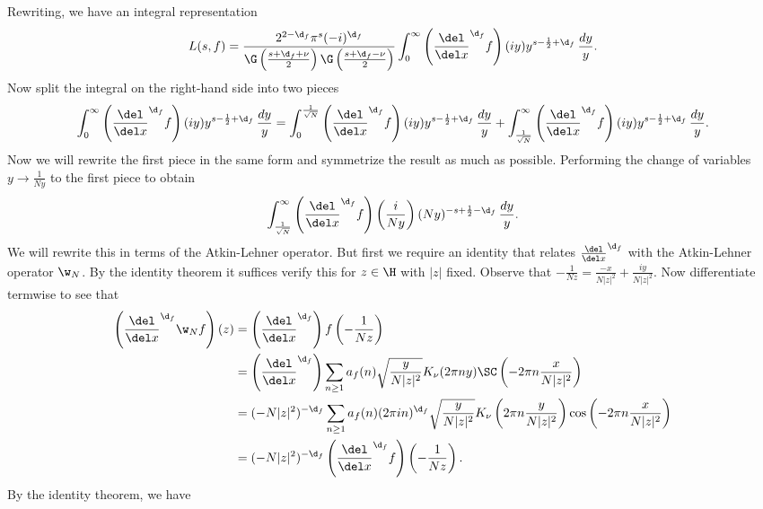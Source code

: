       Rewriting, we have an integral representation
      \begin{equation}\label{equ:integral_representation_Maass_1}
        L(s,f) = \frac{2^{2-\d_{f}}\pi^{s}(-i)^{\d_{f}}}{\G\left(\frac{s+\d_{f}+\nu}{2}\right)\G\left(\frac{s+\d_{f}-\nu}{2}\right)}\int_{0}^{\infty}\left(\frac{\del}{\del x}^{\d_{f}}f\right)(iy)y^{s-\frac{1}{2}+\d_{f}}\,\frac{dy}{y}.
      \end{equation}
      Now split the integral on the right-hand side into two pieces
      \begin{equation}\label{equ:symmetric_integral_Maass_split}
        \int_{0}^{\infty}\left(\frac{\del}{\del x}^{\d_{f}}f\right)(iy)y^{s-\frac{1}{2}+\d_{f}}\,\frac{dy}{y} = \int_{0}^{\frac{1}{\sqrt{N}}}\left(\frac{\del}{\del x}^{\d_{f}}f\right)(iy)y^{s-\frac{1}{2}+\d_{f}}\,\frac{dy}{y}+\int_{\frac{1}{\sqrt{N}}}^{\infty}\left(\frac{\del}{\del x}^{\d_{f}}f\right)(iy)y^{s-\frac{1}{2}+\d_{f}}\,\frac{dy}{y}.
      \end{equation}
      Now we will rewrite the first piece in the same form and symmetrize the result as much as possible. Performing the change of variables $y \to \frac{1}{Ny}$ to the first piece to obtain
      \[
        \int_{\frac{1}{\sqrt{N}}}^{\infty}\left(\frac{\del}{\del x}^{\d_{f}}f\right)\left(\frac{i}{Ny}\right)(Ny)^{-s+\frac{1}{2}-\d_{f}}\,\frac{dy}{y}.
      \]
      We will rewrite this in terms of the Atkin-Lehner operator. But first we require an identity that relates $\frac{\del}{\del x}^{\d_{f}}$ with the Atkin-Lehner operator $\w_{N}$. By the identity theorem it suffices verify this for $z \in \H$ with $|z|$ fixed. Observe that $-\frac{1}{Nz} = \frac{-x}{N|z|^{2}}+\frac{iy}{N|z|^{2}}$. Now differentiate termwise to see that
      \begin{align*}
        \left(\frac{\del}{\del x}^{\d_{f}}\w_{N}f\right)(z) &= \left(\frac{\del}{\del x}^{\d_{f}}\right)f\left(-\frac{1}{Nz}\right) \\
         &= \left(\frac{\del}{\del x}^{\d_{f}}\right)\sum_{n \ge 1}a_{f}(n)\sqrt{\frac{y}{N|z|^{2}}}K_{\nu}(2\pi ny)\SC\left(-2\pi n\frac{x}{N|z|^{2}}\right) \\
        &= (-N|z|^{2})^{-\d_{f}}\sum_{n \ge 1}a_{f}(n)(2\pi in)^{\d_{f}}\sqrt{\frac{y}{N|z|^{2}}}K_{\nu}\left(2\pi n\frac{y}{N|z|^{2}}\right)\cos\left(-2\pi n\frac{x}{N|z|^{2}}\right) \\
        &= (-N|z|^{2})^{-\d_{f}}\left(\frac{\del}{\del x}^{\d_{f}}f\right)\left(-\frac{1}{Nz}\right).
      \end{align*}
      By the identity theorem, we have

